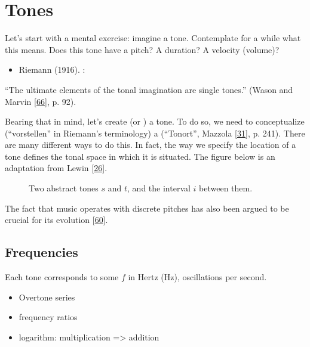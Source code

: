\documentclass[letterpaper,10pt,english]{sphinxmanual}
\begin{document}
\section{Tones}
\label{\detokenize{1_fundamentals:tones}}
\sphinxAtStartPar
Let’s start with a mental exercise: imagine a tone.
Contemplate for a while what this means.
Does this tone have a pitch? A duration? A velocity (volume)?
\begin{itemize}
\item {} 
\sphinxAtStartPar
Riemann (1916). :

\end{itemize}

\sphinxAtStartPar
“The ultimate elements of the tonal imagination are single tones.”
(Wason and Marvin {[}\hyperlink{cite.8_bibliography:id19}{66}{]}, p. 92).

\sphinxAtStartPar
Bearing that in mind, let’s create (or ) a tone. To do so, we need to
conceptualize (“vorstellen” in Riemann’s terminology) a 
(“Tonort”, Mazzola {[}\hyperlink{cite.8_bibliography:id45}{31}{]}, p. 241).
There are many different ways to do this. In fact, the way we specify the location of a tone
defines the tonal space in which it is situated.
The figure below is an adaptation from Lewin {[}\hyperlink{cite.8_bibliography:id2}{26}{]}.
\begin{figure}[htbp]\centering\capstart{}\caption{Two abstract tones \(s\) and \(t\), and the interval \(i\) between them.}\label{\detokenize{1_fundamentals:id8}}\end{figure}
\sphinxAtStartPar
The fact that music operates with discrete pitches has also been argued to be crucial for its
evolution {[}\hyperlink{cite.8_bibliography:id48}{60}{]}.


\subsection{Frequencies}
\label{\detokenize{1_fundamentals:frequencies}}
\sphinxAtStartPar
Each tone corresponds to some  \(f\) in Hertz (Hz),
oscillations per second.
\begin{itemize}
\item {} 
\sphinxAtStartPar
Overtone series

\item {} 
\sphinxAtStartPar
frequency ratios

\item {} 
\sphinxAtStartPar
logarithm: multiplication =\textgreater{} addition

\end{itemize}
\end{document}
